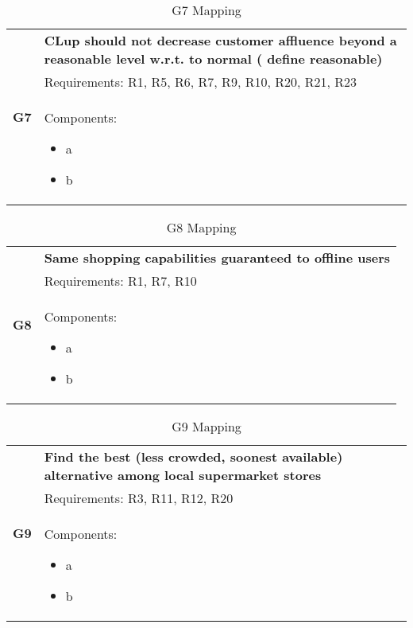 \begin{table}[H]
	\begin{tabular}{|c|p{14cm}|}
		\hline
		\multirow{3}{*}[-3em]{\textbf{G7}} & \cellcolor{Dandelion} \textbf{CLup should not decrease customer affluence beyond a reasonable level w.r.t. to
normal ( define reasonable)}\\ \cline{2-2}
		& \cellcolor{GreenYellow} Requirements: R1, R5, R6, R7, R9, R10, R20, R21, R23\\ \cline{2-2}
		& \cellcolor{SkyBlue} Components: \begin{itemize}
			\item a
			\item b
		\end{itemize}\\ \hline
	\end{tabular}
	\label{tab:G7Mapping}
	\caption{G7 Mapping}
\end{table}

\begin{table}[H]
	\begin{tabular}{|c|p{14cm}|}
		\hline
		\multirow{3}{*}[-3em]{\textbf{G8}} & \cellcolor{Dandelion} \textbf{Same shopping capabilities guaranteed to offline users}\\ \cline{2-2}
		& \cellcolor{GreenYellow} Requirements: R1, R7, R10\\ \cline{2-2}
		& \cellcolor{SkyBlue} Components: \begin{itemize}
			\item a
			\item b
		\end{itemize}\\ \hline
	\end{tabular}
	\label{tab:G8Mapping}
	\caption{G8 Mapping}
\end{table}

\begin{table}[H]
	\begin{tabular}{|c|p{14cm}|}
		\hline
		\multirow{3}{*}[-3em]{\textbf{G9}} &  \textbf{Find the best (less crowded, soonest available) alternative among local supermarket stores}\\ \cline{2-2}
		& \cellcolor{Goldenrod} Requirements: R3, R11, R12, R20\\ \cline{2-2}
		&  Components: \begin{itemize}
			\item a
			\item b
		\end{itemize}\\ \hline
	\end{tabular}
	\label{tab:G9Mapping}
	\caption{G9 Mapping}
\end{table}

